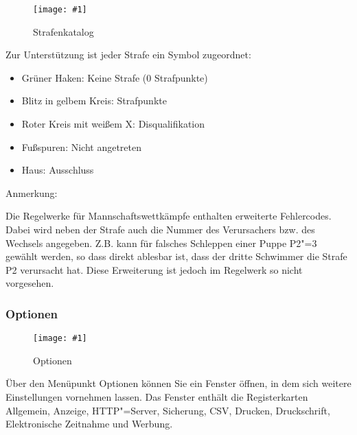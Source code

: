\documentclass[11pt,a4paper,twoside,ngerman]{article}
\newcommand{\hsmimage}[3]{\begin{figure}[!ht]\centering\texttt{[image: \#1]}\caption{#3}\end{figure}}
\begin{document}
\hsmimage{pics/strafenkatalog}{.80\textwidth}{Strafenkatalog}
Zur Unterstützung ist jeder Strafe ein Symbol zugeordnet:
\begin{itemize}

\item Grüner Haken: Keine Strafe (0 Strafpunkte)


\item Blitz in gelbem Kreis: Strafpunkte


\item Roter Kreis mit weißem X: Disqualifikation


\item Fußspuren: Nicht angetreten


\item Haus: Ausschluss


\end{itemize}


\begin{bfseries}Anmerkung:\end{bfseries} Die Regelwerke für Mannschaftswettkämpfe enthalten erweiterte Fehlercodes. Dabei wird neben der Strafe auch die Nummer des Verursachers bzw. des Wechsels angegeben. Z.B. kann für falsches Schleppen einer Puppe P2"=3 gewählt werden, so dass direkt ablesbar ist, dass der dritte Schwimmer die Strafe P2 verursacht hat. Diese Erweiterung ist jedoch im Regelwerk so nicht vorgesehen.


\subsubsection*{Optionen}

\hsmimage{pics/optionen-allgemein}{.66\textwidth}{Optionen}
\label{lbl:jauswertungmenus:optionen}Über den Menüpunkt \glqq{}Optionen\grqq{} können Sie ein Fenster öffnen, in dem sich weitere Einstellungen vornehmen lassen. Das Fenster enthält die Registerkarten \glqq{}Allgemein\grqq{}, \glqq{}Anzeige\grqq{}, \glqq{}HTTP"=Server\grqq{}, \glqq{}Sicherung\grqq{}, \glqq{}CSV\grqq{}, \glqq{}Drucken\grqq{}, \glqq{}Druckschrift\grqq{}, \glqq{}Elektronische Zeitnahme\grqq{} und \glqq{}Werbung\grqq{}.
\end{document}
